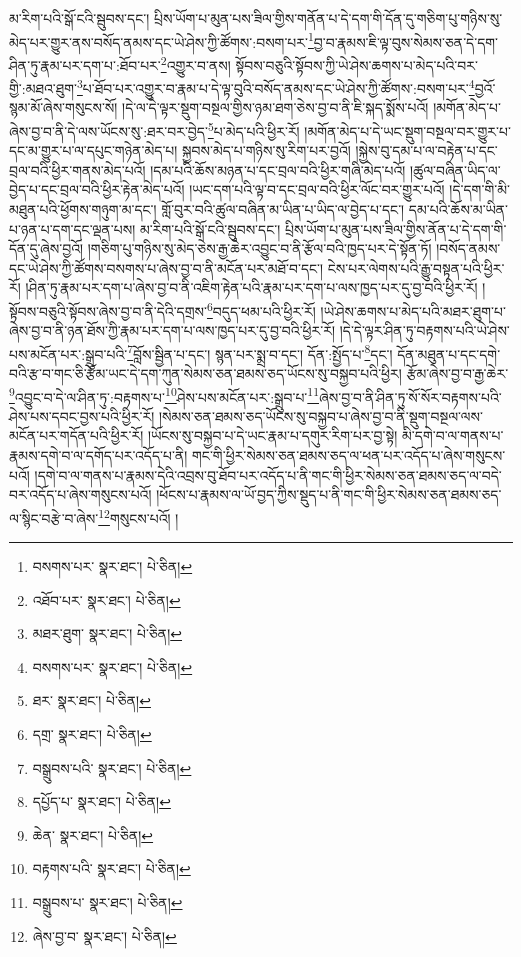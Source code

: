 མ་རིག་པའི་སྒོ་ངའི་སྦུབས་དང་། པྲིས་ཡོག་པ་མུན་པས་ཟིལ་གྱིས་གནོན་པ་དེ་དག་གི་དོན་དུ་གཅིག་པུ་གཉིས་སུ་མེད་པར་གྱུར་ནས་བསོད་ནམས་དང་ཡེ་ཤེས་ཀྱི་ཚོགས་:བསག་པར་\footnote{བསགས་པར་  སྣར་ཐང་།  པེ་ཅིན། }བྱ་བ་རྣམས་ཇི་ལྟ་བུས་སེམས་ཅན་དེ་དག་ཤིན་ཏུ་རྣམ་པར་དག་པ་:ཐོབ་པར་\footnote{འཐོབ་པར་  སྣར་ཐང་།  པེ་ཅིན། }འགྱུར་བ་ནས། སྟོབས་བཅུའི་སྟོབས་ཀྱི་ཡེ་ཤེས་ཆགས་པ་མེད་པའི་བར་གྱི་:མཐའ་ཐུག་\footnote{མཐར་ཐུག་  སྣར་ཐང་།  པེ་ཅིན། }པ་ཐོབ་པར་འགྱུར་བ་རྣམ་པ་དེ་ལྟ་བུའི་བསོད་ནམས་དང་ཡེ་ཤེས་ཀྱི་ཚོགས་:བསག་པར་\footnote{བསགས་པར་  སྣར་ཐང་།  པེ་ཅིན། }བྱའོ་སྙམ་མོ་ཞེས་གསུངས་སོ། །དེ་ལ་དེ་ལྟར་སྡུག་བསྔལ་གྱིས་ཉམ་ཐག་ཅེས་བྱ་བ་ནི་ཇི་སྐད་སྨོས་པའོ། །མགོན་མེད་པ་ཞེས་བྱ་བ་ནི་དེ་ལས་ཡོངས་སུ་:ཐར་བར་བྱེད་\footnote{ཐར་  སྣར་ཐང་།  པེ་ཅིན། }པ་མེད་པའི་ཕྱིར་རོ། །མགོན་མེད་པ་དེ་ཡང་སྡུག་བསྔལ་བར་གྱུར་པ་དང་མ་གྱུར་པ་ལ་དཔུང་གཉེན་མེད་པ། སྐྱབས་མེད་པ་གཉིས་སུ་རིག་པར་བྱའོ། །སྐྱེས་བུ་དམ་པ་ལ་བརྟེན་པ་དང་བྲལ་བའི་ཕྱིར་གནས་མེད་པའོ། །དམ་པའི་ཆོས་མཉན་པ་དང་བྲལ་བའི་ཕྱིར་གཞི་མེད་པའོ། །ཚུལ་བཞིན་ཡིད་ལ་བྱེད་པ་དང་བྲལ་བའི་ཕྱིར་རྟེན་མེད་པའོ། །ཡང་དག་པའི་ལྟ་བ་དང་བྲལ་བའི་ཕྱིར་ལོང་བར་གྱུར་པའོ། །དེ་དག་གི་མི་མཐུན་པའི་ཕྱོགས་གཉུག་མ་དང་། གློ་བུར་བའི་ཚུལ་བཞིན་མ་ཡིན་པ་ཡིད་ལ་བྱེད་པ་དང་། དམ་པའི་ཆོས་མ་ཡིན་པ་ཉན་པ་དག་དང་ལྡན་པས། མ་རིག་པའི་སྒོ་ངའི་སྦུབས་དང་། པྲིས་ཡོག་པ་མུན་པས་ཟིལ་གྱིས་ནོན་པ་དེ་དག་གི་དོན་དུ་ཞེས་བྱའོ། །གཅིག་པུ་གཉིས་སུ་མེད་ཅེས་རྒྱ་ཆེར་འབྱུང་བ་ནི་རྩོལ་བའི་ཁྱད་པར་དེ་སྟོན་ཏོ། །བསོད་ནམས་དང་ཡེ་ཤེས་ཀྱི་ཚོགས་བསགས་པ་ཞེས་བྱ་བ་ནི་མངོན་པར་མཐོ་བ་དང་། ངེས་པར་ལེགས་པའི་རྒྱུ་བསྟན་པའི་ཕྱིར་རོ། །ཤིན་ཏུ་རྣམ་པར་དག་པ་ཞེས་བྱ་བ་ནི་འཇིག་རྟེན་པའི་རྣམ་པར་དག་པ་ལས་ཁྱད་པར་དུ་བྱ་བའི་ཕྱིར་རོ། །སྟོབས་བཅུའི་སྟོབས་ཞེས་བྱ་བ་ནི་དེའི་དགྲས་\footnote{དགྲ་  སྣར་ཐང་།  པེ་ཅིན། }བདུད་ཕམ་པའི་ཕྱིར་རོ། །ཡེ་ཤེས་ཆགས་པ་མེད་པའི་མཐར་ཐུག་པ་ཞེས་བྱ་བ་ནི་ཉན་ཐོས་ཀྱི་རྣམ་པར་དག་པ་ལས་ཁྱད་པར་དུ་བྱ་བའི་ཕྱིར་རོ། །དེ་དེ་ལྟར་ཤིན་ཏུ་བརྟགས་པའི་ཡེ་ཤེས་པས་མངོན་པར་:སྒྲུབ་པའི་\footnote{བསྒྲུབས་པའི་  སྣར་ཐང་།  པེ་ཅིན། }བློས་སྦྱིན་པ་དང་། སྙན་པར་སྨྲ་བ་དང་། དོན་:སྤྱོད་པ་\footnote{དཔྱོད་པ་  སྣར་ཐང་།  པེ་ཅིན། }དང་། དོན་མཐུན་པ་དང་དགེ་བའི་རྩ་བ་གང་ཅི་རྩོམ་ཡང་དེ་དག་ཀུན་སེམས་ཅན་ཐམས་ཅད་ཡོངས་སུ་བསྐྱབ་པའི་ཕྱིར། རྩོམ་ཞེས་བྱ་བ་རྒྱ་ཆེར་\footnote{ཆེན་  སྣར་ཐང་།  པེ་ཅིན། }འབྱུང་བ་དེ་ལ་ཤིན་ཏུ་:བརྟགས་པ་\footnote{བརྟགས་པའི་  སྣར་ཐང་།  པེ་ཅིན། }ཤེས་པས་མངོན་པར་:སྒྲུབ་པ་\footnote{བསྒྲུབས་པ་  སྣར་ཐང་།  པེ་ཅིན། }ཞེས་བྱ་བ་ནི་ཤིན་ཏུ་སོ་སོར་བརྟགས་པའི་ཤེས་པས་དབང་བྱས་པའི་ཕྱིར་རོ། །སེམས་ཅན་ཐམས་ཅད་ཡོངས་སུ་བསྐྱབ་པ་ཞེས་བྱ་བ་ནི་སྡུག་བསྔལ་ལས་མངོན་པར་གདོན་པའི་ཕྱིར་རོ། །ཡོངས་སུ་བསྐྱབ་པ་དེ་ཡང་རྣམ་པ་དགུར་རིག་པར་བྱ་སྟེ། མི་དགེ་བ་ལ་གནས་པ་རྣམས་དགེ་བ་ལ་དགོད་པར་འདོད་པ་ནི། གང་གི་ཕྱིར་སེམས་ཅན་ཐམས་ཅད་ལ་ཕན་པར་འདོད་པ་ཞེས་གསུངས་པའོ། །དགེ་བ་ལ་གནས་པ་རྣམས་དེའི་འབྲས་བུ་ཐོབ་པར་འདོད་པ་ནི་གང་གི་ཕྱིར་སེམས་ཅན་ཐམས་ཅད་ལ་བདེ་བར་འདོད་པ་ཞེས་གསུངས་པའོ། །ཕོངས་པ་རྣམས་ལ་ཡོ་བྱད་ཀྱིས་སྡུད་པ་ནི་གང་གི་ཕྱིར་སེམས་ཅན་ཐམས་ཅད་ལ་སྙིང་བརྩེ་བ་ཞེས་\footnote{ཞེས་བྱ་བ་  སྣར་ཐང་།  པེ་ཅིན། }གསུངས་པའོ། །
